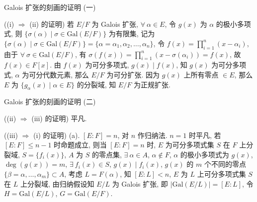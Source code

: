 \begin{frame}{Galois 扩张的刻画的证明 (一)}

\startproof[bg=yellow, fg=red]((i) $\Longrightarrow$ (ii) 的证明)
若 $E/F$ 为 Galois 扩张, $\forall\ \alpha \in E$, 令 $g(x)$ 为 $\alpha$
的极小多项式, 则
$\{ \sigma(\alpha) \mid \sigma \in \mathrm{Gal}(E/F) \}$ 为有限集,
记为 $\{ \sigma(\alpha) \mid \sigma \in \mathrm{Gal}(E/F) \}
= \{ \alpha = \alpha_1, \alpha_2, \dots, \alpha_n \}$,
令 $f(x) = \prod_{i=1}^{n} (x - \alpha_i)$, 由于 $\forall\ \sigma \in \mathrm{Gal}(E/F)$,
有 $\sigma(f(x)) = \prod_{i=1}^{n} (x - \sigma(\alpha_i)) = f(x)$, 故 $f(x) \in F[x]$.
由 $f(x)$ 为可分多项式, $g(x) \mid f(x)$, 知 $g(x)$ 为可分多项式,
$\alpha$ 为可分代数元素, 那么 $E/F$ 为可分扩张.
因为 $g(x)$ 上所有零点 $\in E$, 那么 $E$ 为 $\{ g_{\alpha}(x) \mid \alpha \in E \}$
的分裂域, 知 $E/F$ 为正规扩张.

\end{frame}


\begin{frame}{Galois 扩张的刻画的证明 (二)}

\startproof[bg=yellow, fg=red]((ii) $\Longrightarrow$ (iii) 的证明)
平凡.

\pause

\startproof[bg=yellow, fg=red]((iii) $\Longrightarrow$ (i) 的证明)
(a). $[E:F] = n$, 对 $n$ 作归纳法.
$n = 1$ 时平凡,
若 $[E:F] \leq n - 1$ 时命题成立, 则当 $[E:F] = n$ 时,
$E$ 为可分多项式集 $S$ 在 $F$ 上分裂域, $S = \{ f_i(x) \}$, $A$ 为 $S$ 的零点集,
$\exists\ \alpha \in A$, $\alpha \notin F$, $\alpha$ 的极小多项式为 $g(x)$,
$\deg(g(x)) = m$,
$\exists\ f_i(x) \in S$, $g(x) \mid f_i(x)$, $g(x)$ 的 $m$ 个不同的零点
$\{ \beta = \alpha, \dots, \alpha_m \} \subset A$,
考虑 $L = F(\alpha)$, 知 $[E:L] < n$, $E$ 为 $L$ 上可分多项式集 $S$ 在 $L$ 上分裂域,
由归纳假设知 $E/L$ 为 Galois 扩张, 即
$|\mathrm{Gal}(E/L)| = [E:L]$, 令 $H = \mathrm{Gal}(E/L)$, $G = \mathrm{Gal}(E/F)$.

\end{frame}


